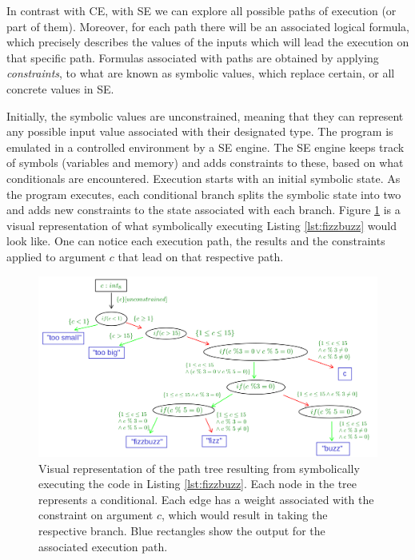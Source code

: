 In contrast with \gls{CE}, with \gls{SE} we can explore all possible paths of execution (or part of them). Moreover, for each path there will be an associated logical formula, which precisely describes the values of the inputs which will lead the execution on that specific path. Formulas associated with paths are obtained by applying \emph{constraints}, to what are known as symbolic values, which replace certain, or all concrete values in \gls{SE}.

Initially, the symbolic values are unconstrained, meaning that they can represent any possible input value associated with their designated type. The program is emulated in a controlled environment by a \gls{SE} engine. The \gls{SE} engine keeps track of symbols (variables and memory) and adds constraints to these, based on what conditionals are encountered. Execution starts with an initial symbolic state. As the program executes, each conditional branch splits the symbolic state into two and adds new constraints to the state associated with each branch. Figure \ref{fig:se} is a visual representation of what symbolically executing Listing \ref{lst:fizzbuzz} would look like. One can notice each execution path, the results and the constraints applied to argument $c$ that lead on that respective path.

\begin{figure}[ht]
    \centering
    \includegraphics[width=\textwidth]{./images/SE}
    \caption{Visual representation of the path tree resulting from symbolically executing the code in Listing \ref{lst:fizzbuzz}. Each node in the tree represents a conditional. Each edge has a weight associated with the constraint on argument $c$, which would result in taking the respective branch. Blue rectangles show the output for the associated execution path.}
    \label{fig:se}
\end{figure}

